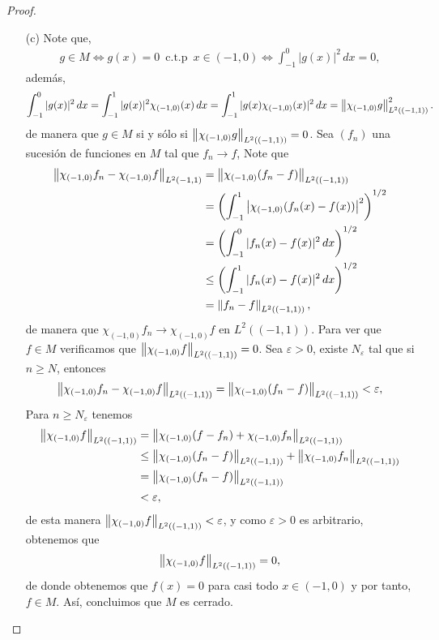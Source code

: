\begin{proof}
\begin{enumerate}
\begin{enumerate}
        \item[(c)] Note que,
        \begin{align*}
            g\in M \Longleftrightarrow g(x)=0\, \text{ c.t.p } \, x\in (-1,0) \Longleftrightarrow \int_{-1}^0|g(x)|^2\, dx=0,
        \end{align*}
        además, 
        \begin{align*}
            \int_{-1}^0|g(x)|^2\, dx=\int_{-1}^1|g(x)|^2\chi_{(-1,0)}(x)\, dx=\int_{-1}^1|g(x)\chi_{(-1,0)}(x)|^2\, dx=\left\|\chi_{(-1,0)}g\right\|_{L^2((-1,1))}^2.
        \end{align*}
        de manera que $g \in M$ si y sólo si $\left\|\chi_{(-1,0)}g\right\|_{L^2((-1,1))}=0$. Sea $(f_n)$ una sucesión de funciones en $M$ tal que $f_n\to f$, Note que 
        \begin{align*}
            \left\|\chi_{(-1,0)} f_n-\chi_{(-1,0)}f\right\|_{L^2(-1,1)}&=\left\|\chi_{(-1,0)}(f_n-f)\right\|_{L^2((-1,1))}\\
            &=\left(\int_{-1}^1\left|\chi_{(-1,0)}(f_n(x)-f(x))\right|^2\right)^{1/2}\\
            &=\left(\int_{-1}^0 |f_n(x)-f(x)|^2\, dx\right)^{1/2}\\
            &\leq \left(\int_{-1}^1 |f_n(x)-f(x)|^2\, dx\right)^{1/2}\\
            &=\left\|f_n-f\right\|_{L^2((-1,1))},
        \end{align*}
        de manera que $\chi_{(-1,0)}f_n\to \chi_{(-1,0)}f$ en $L^2((-1,1))$. Para ver que $f \in M$ verificamos que $\left\|\chi_{(-1,0)}f\right\|_{L^2((-1,1))}=0$. Sea $\varepsilon>0$, existe $N_\varepsilon$ tal que si $n\geq N$, entonces 
        \begin{align*}
            \left\|\chi_{(-1,0)}f_n-\chi_{(-1,0)}f\right\|_{L^2((-1,1))}=\left\|\chi_{(-1,0)}(f_n-f)\right\|_{L^2((-1,1))}<\varepsilon,
        \end{align*}
        Para $n\geq N_\varepsilon$ tenemos
        \begin{align*}
            \left\|\chi_{(-1,0)}f\right\|_{L^2((-1,1))}&=\left\|\chi_{(-1,0)}(f-f_n)+\chi_{(-1,0)}f_n\right\|_{L^2((-1,1))}\\
            &\leq \left\|\chi_{(-1,0)}(f_n-f)\right\|_{L^2((-1,1))}+\left\|\chi_{(-1,0)}f_n\right\|_{L^2((-1,1))}\\
            &=\left\|\chi_{(-1,0)}(f_n-f)\right\|_{L^2((-1,1))}\\
            &<\varepsilon,
        \end{align*}
        de esta manera $\left\|\chi_{(-1,0)}f\right\|_{L^2((-1,1))}<\varepsilon$, y como $\varepsilon>0$ es arbitrario, obtenemos que 
        \begin{align*}
            \left\|\chi_{(-1,0)}f\right\|_{L^2((-1,1))}=0,
        \end{align*}
        de donde obtenemos que $f(x)=0$ para casi todo $x \in (-1,0)$ y por tanto, $f\in M$. Así, concluimos que $M$ es cerrado.


\end{enumerate}
\end{enumerate}
\end{proof}

